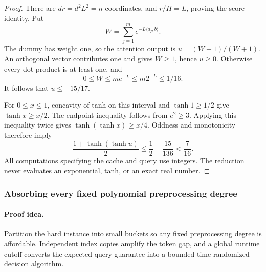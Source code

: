 \begin{proof}
There are $dr=d^2L^2=n$ coordinates, and $r/H=L$, proving the score
identity.  Put
\[
 W=\sum_{j=1}^m e^{-L\langle a_j,b\rangle}.
\]
The dummy has weight one, so the attention output is
$u=(W-1)/(W+1)$.  An orthogonal vector contributes one and gives
$W\ge1$, hence $u\ge0$.  Otherwise every dot product is at least one,
and
\[
 0\le W\le m e^{-L}\le m2^{-L}\le1/16.
\]
It follows that $u\le-15/17$.

For $0\le x\le1$, concavity of tanh on this interval and
$\tanh1\ge1/2$ give $\tanh x\ge x/2$.  The endpoint inequality follows
from $e^2\ge3$.  Applying this inequality twice gives
$\tanh(\tanh x)\ge x/4$.  Oddness and monotonicity therefore imply
\[
 \frac{1+\tanh(\tanh u)}2
 \le\frac12-\frac{15}{136}<\frac7{16}.
\]
All computations specifying the cache and query use integers.  The
reduction never evaluates an exponential, tanh, or an exact real number.
\end{proof}

\subsubsection{Absorbing every fixed polynomial preprocessing degree}

\paragraph{Proof idea.}
Partition the hard instance into small buckets so any fixed preprocessing degree is affordable.  Independent index copies amplify the token gap, and a global runtime cutoff converts the expected query guarantee into a bounded-time randomized decision algorithm.

